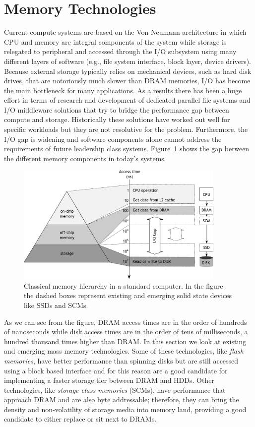 \section{Memory Technologies}\label{section: mem-tech}
Current compute systems are based on the Von Neumann architecture in which CPU and memory are integral components of the system while storage is relegated to peripheral and accessed through the I/O subsystem using many 
different layers of software (e.g., file system interface, block layer, device drivers). Because external storage typically relies on mechanical devices, such as hard disk drives, that are notoriously much slower than DRAM 
memories, I/O has become the main bottleneck for many applications. As a results there has been a huge effort in terms of research and development of dedicated parallel file systems and I/O middleware solutions that try to 
bridge the performance gap between compute and storage. Historically these solutions have worked out well for specific workloads but they are not resolutive for the problem. Furthermore, the I/O gap is widening and software 
components alone cannot address the requirements of future leadership class systems. Figure~\ref{figure: io-gap} shows the gap between the different memory components in today's systems.

\begin{figure}[!htb]
\centering
\includegraphics[width=0.9\textwidth]{figures/io-gap}
\caption{Classical memory hierarchy in a standard computer. In the figure the dashed boxes represent existing and emerging solid state devices like SSDs and SCMs.}
\label{figure: io-gap}
\end{figure}

As we can see from the figure, DRAM access times are in the order of hundreds of nanoseconds while disk access times are in the order of tens of milliseconds, a hundred thousand times higher than DRAM. In this section 
we look at existing and emerging mass memory technologies. Some of these technologies, like \textit{flash memories}, have better performance than spinning disks but are still accessed using a block based interface and 
for this reason are a good candidate for implementing a faster storage tier between DRAM and HDDs. Other technologies, like \textit{storage class memories} (SCMs), have performance that approach DRAM and are also byte 
addressable; therefore, they can bring the density and non-volatility of storage media into memory land, providing a good candidate to either replace or sit next to DRAMs.


